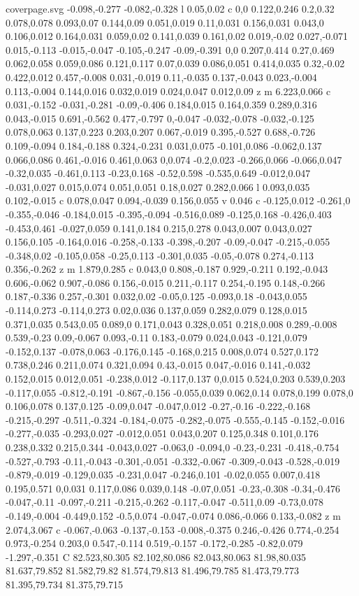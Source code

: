 \begin{filecontents}[noheader]{coverpage.svg}
-0.098,-0.277 -0.082,-0.328 l 0.05,0.02 c 0,0 0.122,0.246 0.2,0.32 0.078,0.078 0.093,0.07 0.144,0.09 0.051,0.019 0.11,0.031 0.156,0.031 0.043,0 0.106,0.012 0.164,0.031 0.059,0.02 0.141,0.039 0.161,0.02 0.019,-0.02 0.027,-0.071 0.015,-0.113 -0.015,-0.047 -0.105,-0.247 -0.09,-0.391 0,0 0.207,0.414 0.27,0.469 0.062,0.058 0.059,0.086 0.121,0.117 0.07,0.039 0.086,0.051 0.414,0.035 0.32,-0.02 0.422,0.012 0.457,-0.008 0.031,-0.019 0.11,-0.035 0.137,-0.043 0.023,-0.004 0.113,-0.004 0.144,0.016 0.032,0.019 0.024,0.047 0.012,0.09 z m 6.223,0.066 c 0.031,-0.152 -0.031,-0.281 -0.09,-0.406 0.184,0.015 0.164,0.359 0.289,0.316 0.043,-0.015 0.691,-0.562 0.477,-0.797 0,-0.047 -0.032,-0.078 -0.032,-0.125 0.078,0.063 0.137,0.223 0.203,0.207 0.067,-0.019 0.395,-0.527 0.688,-0.726 0.109,-0.094 0.184,-0.188 0.324,-0.231 0.031,0.075 -0.101,0.086 -0.062,0.137 0.066,0.086 0.461,-0.016 0.461,0.063 0,0.074 -0.2,0.023 -0.266,0.066 -0.066,0.047 -0.32,0.035 -0.461,0.113 -0.23,0.168 -0.52,0.598 -0.535,0.649 -0.012,0.047 -0.031,0.027 0.015,0.074 0.051,0.051 0.18,0.027 0.282,0.066 l 0.093,0.035 0.102,-0.015 c 0.078,0.047 0.094,-0.039 0.156,0.055 v 0.046 c -0.125,0.012 -0.261,0 -0.355,-0.046 -0.184,0.015 -0.395,-0.094 -0.516,0.089 -0.125,0.168 -0.426,0.403 -0.453,0.461 -0.027,0.059 0.141,0.184 0.215,0.278 0.043,0.007 0.043,0.027 0.156,0.105 -0.164,0.016 -0.258,-0.133 -0.398,-0.207 -0.09,-0.047 -0.215,-0.055 -0.348,0.02 -0.105,0.058 -0.25,0.113 -0.301,0.035 -0.05,-0.078 0.274,-0.113 0.356,-0.262 z m 1.879,0.285 c 0.043,0 0.808,-0.187 0.929,-0.211 0.192,-0.043 0.606,-0.062 0.907,-0.086 0.156,-0.015 0.211,-0.117 0.254,-0.195 0.148,-0.266 0.187,-0.336 0.257,-0.301 0.032,0.02 -0.05,0.125 -0.093,0.18 -0.043,0.055 -0.114,0.273 -0.114,0.273 0.02,0.036 0.137,0.059 0.282,0.079 0.128,0.015 0.371,0.035 0.543,0.05 0.089,0 0.171,0.043 0.328,0.051 0.218,0.008 0.289,-0.008 0.539,-0.23 0.09,-0.067 0.093,-0.11 0.183,-0.079 0.024,0.043 -0.121,0.079 -0.152,0.137 -0.078,0.063 -0.176,0.145 -0.168,0.215 0.008,0.074 0.527,0.172 0.738,0.246 0.211,0.074 0.321,0.094 0.43,-0.015 0.047,-0.016 0.141,-0.032 0.152,0.015 0.012,0.051 -0.238,0.012 -0.117,0.137 0,0.015 0.524,0.203 0.539,0.203 -0.117,0.055 -0.812,-0.191 -0.867,-0.156 -0.055,0.039 0.062,0.14 0.078,0.199 0.078,0 0.106,0.078 0.137,0.125 -0.09,0.047 -0.047,0.012 -0.27,-0.16 -0.222,-0.168 -0.215,-0.297 -0.511,-0.324 -0.184,-0.075 -0.282,-0.075 -0.555,-0.145 -0.152,-0.016 -0.277,-0.035 -0.293,0.027 -0.012,0.051 0.043,0.207 0.125,0.348 0.101,0.176 0.238,0.332 0.215,0.344 -0.043,0.027 -0.063,0 -0.094,0 -0.23,-0.231 -0.418,-0.754 -0.527,-0.793 -0.11,-0.043 -0.301,-0.051 -0.332,-0.067 -0.309,-0.043 -0.528,-0.019 -0.879,-0.019 -0.129,0.035 -0.231,0.047 -0.246,0.101 -0.02,0.055 0.007,0.418 0.195,0.571 0,0.031 0.117,0.086 0.039,0.148 -0.07,0.051 -0.23,-0.308 -0.34,-0.476 -0.047,-0.11 -0.097,-0.211 -0.215,-0.262 -0.117,-0.047 -0.511,0.09 -0.73,0.078 -0.149,-0.004 -0.449,0.152 -0.5,0.074 -0.047,-0.074 0.086,-0.066 0.133,-0.082 z m 2.074,3.067 c -0.067,-0.063 -0.137,-0.153 -0.008,-0.375 0.246,-0.426 0.774,-0.254 0.973,-0.254 0.203,0 0.547,-0.114 0.519,-0.157 -0.172,-0.285 -0.82,0.079 -1.297,-0.351 C 82.523,80.305 82.102,80.086 82.043,80.063 81.98,80.035 81.637,79.852 81.582,79.82 81.574,79.813 81.496,79.785 81.473,79.773 81.395,79.734 81.375,79.715 
\end{filecontents}
